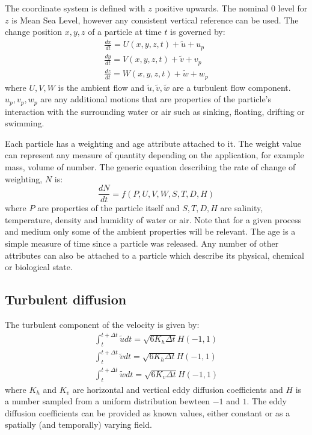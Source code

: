 \documentclass[a4paper]{article}
\begin{document}
The coordinate system is defined with $z$ positive upwards. The nominal 0 level for $z$ is Mean Sea Level, however any consistent vertical reference can be used.
The change position $x,y,z$ of a particle at time $t$ is governed by:\begin{align}
\frac{dx}{dt} = U(x,y,z,t)+\tilde{u}+u_p \\
\frac{dy}{dt} = V(x,y,z,t)+\tilde{v}+v_p \\ 
\frac{dz}{dt} = W(x,y,z,t)+\tilde{w}+w_p 
\end{align}
where $U,V,W$ is the ambient flow and $\tilde{u},\tilde{v},\tilde{w}$ are a turbulent flow component. $u_p,v_p,w_p$ are any additional motions that are properties of the particle's interaction with the surrounding water or air such as sinking, floating, drifting or swimming.

Each particle has a weighting and age attribute attached to it. The weight value can represent any measure of quantity depending on the application, for example mass, volume of number.
The generic equation describing the rate of change of weighting, $N$ is:
\begin{equation}\frac{dN}{dt}=f(P,U,V,W,S,T,D,H)\end{equation}
where $P$ are properties of the particle itself and $S,T,D,H$ are salinity, temperature, density and humidity of water or air.
Note that for a given process and medium only some of the ambient properties will be relevant. The age is a simple measure of time since a particle was released.
Any number of other attributes can also be attached to a particle which describe its physical, chemical or biological state.

\subsection{Turbulent diffusion}
The turbulent component of the velocity is given by:
\begin{align}
\int_{t}^{t+\Delta t} \tilde{u} dt = \sqrt{6K_h \Delta t} H(-1,1) \\
\int_{t}^{t+\Delta t} \tilde{v} dt = \sqrt{6K_h \Delta t} H(-1,1) \\
\int_{t}^{t+\Delta t} \tilde{w} dt = \sqrt{6K_v \Delta t} H(-1,1)
\end{align}
where $K_h$ and $K_v$ are horizontal and vertical eddy diffusion coefficients and $H$ is a number sampled from a uniform distribution bewteen $-1$ and $1$.
The eddy diffusion coefficients can be provided as known values, either constant or as a spatially (and temporally) varying field.
\end{document}
